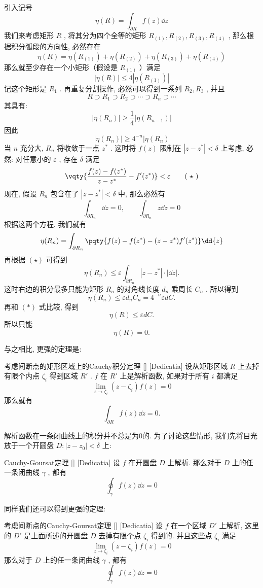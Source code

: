 \documentclass[UTF8]{ctexart}
\begin{document}
\begin{prf}
    引入记号
    \[\eta(R)=\int_{\partial R}f(z)\dd{z}\]
    我们来考虑矩形 \( R \) , 将其分为四个全等的矩形 \( R_{(1)}, R_{(2)}, R_{(3)}, R_{(4)} \) , 那么根据积分弧段的方向性, 必然存在
    \[\eta(R)=\eta(R_{(1)})+\eta(R_{(2)})+\eta(R_{(3)})+\eta(R_{(4)})\]
    那么就至少存在一个小矩形（假设是 \( R_{(1)} \) ）满足
    \[|\eta(R)|\leqslant 4|\eta(R_{(1)})|\]
    记这个矩形是 \( R_1 \) . 再重复分割操作, 必然可以得到一系列 \( R_2, R_3 \) , 并且
    \[R\supset R_1\supset R_2\supset\cdots\supset R_n\supset\cdots\]
    其具有: 
    \[|\eta(R_n)|\geqslant \frac{1}{4}|\eta(R_{n-1})|\]
    因此
    \[|\eta(R_n)|\geqslant 4^{-n}|\eta(R_n)\tag{ \( \ast \) }\]
    当 \( n \) 充分大,  \( R_n \) 将收敛于一点 \( z^* \) . 这时将 \( f(z) \) 限制在 \( |z-z^*|<\delta  \) 上考虑, 必然: 对任意小的 \( \varepsilon \) , 存在 \( \delta \) 满足
    \[\vqty{\frac{f(z)-f(z^*)}{z-z^*}-f'(z^*)}<\varepsilon\tag{ \( \star \) }\]
    现在, 假设 \( R_n \) 包含在了 \( |z-z^*|<\delta \) 中, 那么必然有
    \[\int_{\partial R_n}\dd{z}=0,\qquad\int_{\partial R_n}z\dd{z}=0\]
    根据这两个方程, 我们就有
    \[\eta(R_n)=\int_{\partial R_n}\pqty{f(z)-f(z^*)-(z-z^*)f'(z^*)}\dd{z}\]
    再根据 \( (\star) \) 可得到
    \[\eta(R_n)\leqslant\varepsilon\int_{\partial R_n}|z-z^*|\cdot|\dd z|. \]
    这时右边的积分最多只能为矩形 \( R_n \) 的对角线长度 \( d_n \) 乘周长 \( C_n \) . 所以得到
    \[\eta(R_n)\leqslant\varepsilon d_nC_n=4^{-n}\varepsilon dC.\]
    再和 \( (\ast) \) 式比较, 得到
    \[\eta(R)\leqslant\varepsilon dC.\]
    所以只能
    \[\eta(R)=0.\]
\end{prf}
与之相比, 更强的定理是: 
\begin{thm}
    [UUID]
    {考虑间断点的矩形区域上的Cauchy积分定理}
    []
    [Dedicatia]
    设从矩形区域 \( R \) 上去掉有限个内点 \( \zeta_i \) 得到区域 \( R' \) .  \( f \) 在 \( R' \) 上是解析函数, 如果对于所有 \( i \) 都满足
    \[\lim_{z\to\zeta_i }(z-\zeta_i)f(z)=0\]
    那么就有
    \[\int_{\partial R}f(z)\dd{z}=0.\]
\end{thm}
解析函数在一条闭曲线上的积分并不总是为0的. 为了讨论这些情形, 我们先将目光放于一个开圆盘 \( D: |z-z_0|<\delta  \) 上:
\begin{thm}
    [UUID]
    {Cauchy-Goursat定理}
    []
    [Dedicatia]
    设 \( f \) 在开圆盘 \( D \) 上解析. 那么对于 \( D \) 上的任一条闭曲线 \( \gamma \) , 都有
    \[\oint_\gamma f(z)\dd{z}=0\]
\end{thm}
同样我们还可以得到更强的定理: 
\begin{thm}
    [UUID]
    {考虑间断点的Cauchy-Goursat定理}
    []
    [Dedicatia]
    设 \( f \) 在一个区域 \( D' \) 上解析, 这里的 \( D' \) 是上面所述的开圆盘 \( D \) 去掉有限个点 \( \zeta_i \) 得到的. 并且这些点 \( \zeta_i \) 满足
    \[\lim_{z\to\zeta_i }(z-\zeta_i)f(z)=0\]
    那么对于 \( D \) 上的任一条闭曲线 \( \gamma \) , 都有
    \[\oint_\gamma f(z)\dd{z}=0\]
\end{thm}
\end{document}
